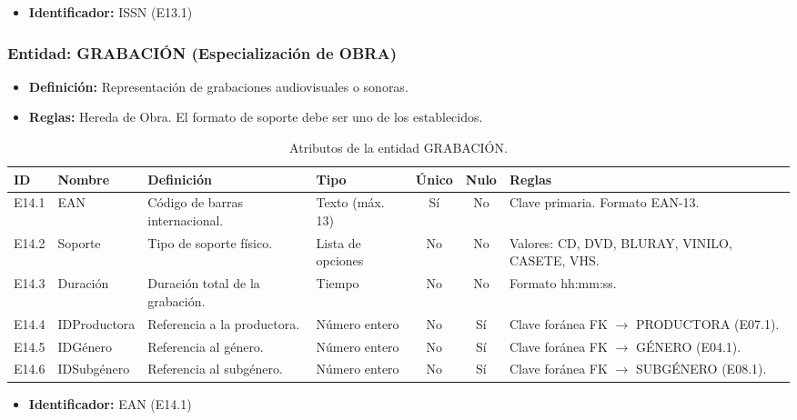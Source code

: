 \begin{itemize}
	\item\textbf{Identificador:} ISSN (E13.1)
\end{itemize}

\subsubsection{Entidad: GRABACIÓN (Especialización de OBRA)}
\begin{itemize}
	\item\textbf{Definición:} Representación de grabaciones audiovisuales o sonoras.
	\item\textbf{Reglas:} Hereda de Obra. El formato de soporte debe ser uno de los establecidos.
\end{itemize}

\begin{table}[H]
	\centering
	\caption{Atributos de la entidad GRABACIÓN.}
	\label{tab:dict_grabacion}
	\small
	\begin{tabularx}{\textwidth}{l l X l c c X}
		\toprule
		\textbf{ID} & \textbf{Nombre} & \textbf{Definición} & \textbf{Tipo} & \textbf{Único} & \textbf{Nulo} & \textbf{Reglas} \\
		\midrule
		E14.1 & EAN & Código de barras internacional. & Texto (máx. 13) & Sí & No & Clave primaria. Formato EAN-13. \\
		\addlinespace
		E14.2 & Soporte & Tipo de soporte físico. & Lista de opciones & No & No & Valores: CD, DVD, BLURAY, VINILO, CASETE, VHS. \\
		\addlinespace
		E14.3 & Duración & Duración total de la grabación. & Tiempo & No & No & Formato hh:mm:ss. \\
		\addlinespace
		E14.4 & IDProductora & Referencia a la productora. & Número entero & No & Sí & Clave foránea FK $\rightarrow$ PRODUCTORA (E07.1). \\
		\addlinespace
		E14.5 & IDGénero & Referencia al género. & Número entero & No & Sí & Clave foránea FK $\rightarrow$ GÉNERO (E04.1). \\
		\addlinespace
		E14.6 & IDSubgénero & Referencia al subgénero. & Número entero & No & Sí & Clave foránea FK $\rightarrow$ SUBGÉNERO (E08.1). \\
		\bottomrule
	\end{tabularx}
\end{table}

\begin{itemize}
	\item\textbf{Identificador:} EAN (E14.1)
\end{itemize}

